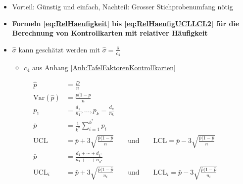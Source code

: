 \begin{itemize}
	\item Vorteil: Günstig und einfach, Nachteil: Grosser Stichprobenumfang nötig
	\item \textbf{Formeln \ref{eq:RelHaeufigkeit} bis \ref{eq:RelHaeufigUCLLCL2} für die Berechnung von Kontrollkarten mit relativer Häufigkeit}
	\item $\hat{\sigma}$ kann geschätzt werden mit $\hat{\sigma}=\frac{\bar{s}}{c_4}$
	\begin{itemize}
		\item $c_4$ aus Anhang \ref{Anh:TafelFaktorenKontrollkarten}
	\end{itemize}
\end{itemize}
\begin{align}
	\label{eq:RelHaeufigkeit}
	\hat{p} &= \frac{D}{n}\\
	\label{eq:VarianzRelHaeufigkeit}
	\text{Var}\left(\hat{p}\right) &= \frac{p(1-p}{n}\\
	\label{eq:RelHaeufigkeitMultiple}
	p_1 &= \frac{d_1}{n_1},\ldots,p_k = \frac{d_k}{n_k}\\
	\label{eq:RelhaeufigkeitCL}
	\bar{p}&=\frac{1}{k^\ast}\sum_{i=1}^{k^\ast}p_i\\
	\label{eq:RelHaeufigUCLLCL}
	\text{UCL} &= \bar{p}+3\sqrt{\frac{\bar{p}(1-\bar{p}}{n}}		\qquad \text{und}\qquad
	\text{LCL} = \bar{p}-3\sqrt{\frac{\bar{p}(1-\bar{p}}{n}}\\
	\label{eq:RelhaeufigkeitCL2}	
	\bar{p}&= \frac{d_1+\cdots +d_{k^\ast}}{n_1+\cdots +n_{k^\ast}}\\
	\label{eq:RelHaeufigUCLLCL2}
	\text{UCL}_i &= \bar{p}+3\sqrt{\frac{\bar{p}(1-\bar{p}}{n_i}}		\qquad \text{und}\qquad
	\text{LCL}_i = \bar{p}-3\sqrt{\frac{\bar{p}(1-\bar{p}}{n_i}}\\
\end{align}
\clearpage